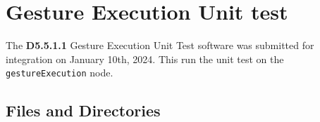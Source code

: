 \documentclass{CSSRforAfrica}
\begin{document}
  
%  



\newpage
 \section{Gesture Execution Unit test} 
\label{section:gesture_execution_test}
The \textbf{D5.5.1.1} Gesture Execution Unit Test software was submitted for integration on January 10th, 2024. This run the unit test on the {\small \verb+gestureExecution+} node.


\subsection{Files and Directories}
\label{subsection:gesture_execution_test_files}
 
\end{document}
